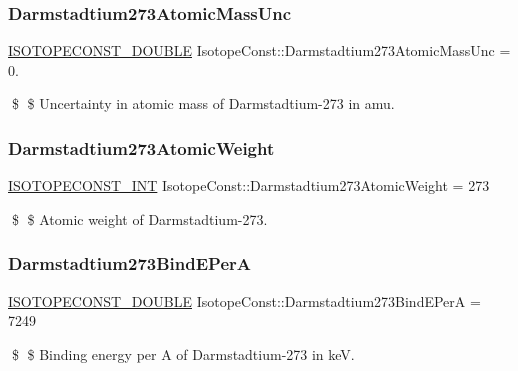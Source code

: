 \subsubsection{\texorpdfstring{Darmstadtium273\+Atomic\+Mass\+Unc}{Darmstadtium273AtomicMassUnc}}
{\footnotesize\ttfamily \mbox{\hyperlink{group___isotope_const-_macros_ga8f45a7272ce02c0b4c65c44636ed719a}{I\+S\+O\+T\+O\+P\+E\+C\+O\+N\+S\+T\+\_\+\+D\+O\+U\+B\+LE}} Isotope\+Const\+::\+Darmstadtium273\+Atomic\+Mass\+Unc = 0.}

\$ \$ Uncertainty in atomic mass of Darmstadtium-\/273 in amu. \mbox{\label{group___isotope_const-_darmstadtium-_ds273_ga0485f579b89f95d918ed355fde5efcf4}} 
\subsubsection{\texorpdfstring{Darmstadtium273\+Atomic\+Weight}{Darmstadtium273AtomicWeight}}
{\footnotesize\ttfamily \mbox{\hyperlink{group___isotope_const-_macros_ga5f18360b3e99483a35c32d789e62621c}{I\+S\+O\+T\+O\+P\+E\+C\+O\+N\+S\+T\+\_\+\+I\+NT}} Isotope\+Const\+::\+Darmstadtium273\+Atomic\+Weight = 273}

\$ \$ Atomic weight of Darmstadtium-\/273. \mbox{\label{group___isotope_const-_darmstadtium-_ds273_ga91c34b2af328f75aff246d3143454028}} 
\subsubsection{\texorpdfstring{Darmstadtium273\+Bind\+E\+PerA}{Darmstadtium273BindEPerA}}
{\footnotesize\ttfamily \mbox{\hyperlink{group___isotope_const-_macros_ga8f45a7272ce02c0b4c65c44636ed719a}{I\+S\+O\+T\+O\+P\+E\+C\+O\+N\+S\+T\+\_\+\+D\+O\+U\+B\+LE}} Isotope\+Const\+::\+Darmstadtium273\+Bind\+E\+PerA = 7249}

\$ \$ Binding energy per A of Darmstadtium-\/273 in keV. \mbox{\label{group___isotope_const-_darmstadtium-_ds273_gabe5fa7e0d55cc96e7caa05d25676ca19}} 

